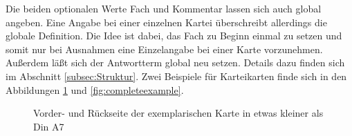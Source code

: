 \documentclass[a4paper]{article}
\begin{document}
Die beiden optionalen Werte Fach und Kommentar lassen sich auch global angeben. Eine Angabe bei einer einzelnen Kartei überschreibt allerdings die globale Definition. Die Idee ist dabei, das Fach zu Beginn einmal zu setzen und somit nur bei Ausnahmen eine Einzelangabe bei einer Karte vorzunehmen. Außerdem läßt sich der Antwortterm global neu setzen. Details dazu finden sich im Abschnitt \ref{subsec:Struktur}. Zwei Beispiele für Karteikarten finde sich in den Abbildungen \ref{fig:example} und \ref{fig:completeexample}.
\begin{figure}
	\quad	{}
	\caption{Vorder- und Rückseite der exemplarischen Karte in etwas kleiner als Din A7}\label{fig:example}
\end{figure}
\end{document}
